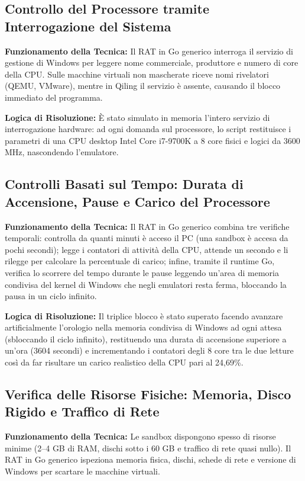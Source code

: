 \documentclass[11pt, a4paper]{article}
\begin{document}
	\subsection{Controllo del Processore tramite Interrogazione del Sistema}
	
	\textbf{Funzionamento della Tecnica:} Il RAT in Go generico interroga il servizio di gestione di Windows per leggere nome commerciale, produttore e numero di core della CPU. Sulle macchine virtuali non mascherate riceve nomi rivelatori (QEMU, VMware), mentre in Qiling il servizio è assente, causando il blocco immediato del programma.
	
	\textbf{Logica di Risoluzione:} È stato simulato in memoria l'intero servizio di interrogazione hardware: ad ogni domanda sul processore, lo script restituisce i parametri di una CPU desktop Intel Core i7-9700K a 8 core fisici e logici da 3600 MHz, nascondendo l'emulatore.
	
	\subsection{Controlli Basati sul Tempo: Durata di Accensione, Pause e Carico del Processore}
	
	\textbf{Funzionamento della Tecnica:} Il RAT in Go generico combina tre verifiche temporali: controlla da quanti minuti è acceso il PC (una sandbox è accesa da pochi secondi); legge i contatori di attività della CPU, attende un secondo e li rilegge per calcolare la percentuale di carico; infine, tramite il runtime Go, verifica lo scorrere del tempo durante le pause leggendo un'area di memoria condivisa del kernel di Windows che negli emulatori resta ferma, bloccando la pausa in un ciclo infinito.
	
	\textbf{Logica di Risoluzione:} Il triplice blocco è stato superato facendo avanzare artificialmente l'orologio nella memoria condivisa di Windows ad ogni attesa (sbloccando il ciclo infinito), restituendo una durata di accensione superiore a un'ora (3604 secondi) e incrementando i contatori degli 8 core tra le due letture così da far risultare un carico realistico della CPU pari al 24,69\%.
	
	\subsection{Verifica delle Risorse Fisiche: Memoria, Disco Rigido e Traffico di Rete}
	
	\textbf{Funzionamento della Tecnica:} Le sandbox dispongono spesso di risorse minime (2--4 GB di RAM, dischi sotto i 60 GB e traffico di rete quasi nullo). Il RAT in Go generico ispeziona memoria fisica, dischi, schede di rete e versione di Windows per scartare le macchine virtuali.
	
\end{document}
